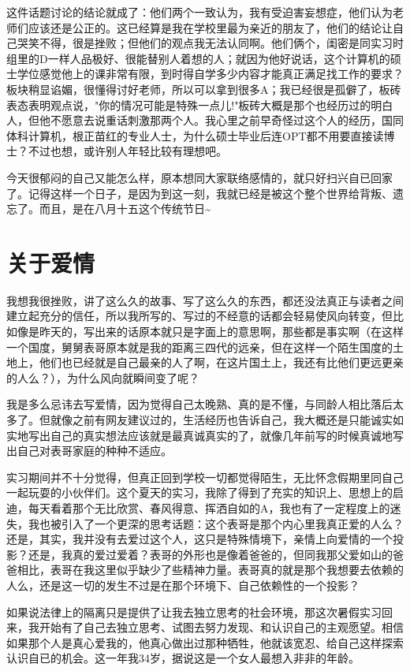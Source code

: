 \documentclass[12pt]{book}
\begin{document}
这件话题讨论的结论就成了：他们两个一致认为，我有受迫害妄想症，他们认为老师们应该还是公正的。这已经算是我在学校里最为亲近的朋友了，他们的结论让自己哭笑不得，很是挫败；但他们的观点我无法认同啊。他们俩个，闺密是同实习时组里的D一样人品极好、很能替别人着想的人；就因为他好说话，这个计算机的硕士学位感觉他上的课非常有限，到时得自学多少内容才能真正满足找工作的要求？板块稍显谄媚，很懂得讨好老师，所以可以拿到很多A；我已经很是孤僻了，板砖表态表明观点说，"你的情况可能是特殊一点儿!"板砖大概是那个也经历过的明白人，但他不愿意去说重话刺激那两个人。我心里之前早奇怪过这个人的经历，国同体科计算机，根正苗红的专业人士，为什么硕士毕业后连OPT都不用要直接读博士？不过也想，或许别人年轻比较有理想吧。

今天很郁闷的自己又能怎么样，原本想同大家联络感情的，就只好扫兴自已回家了。记得这样一个日子，是因为到这一刻，我就已经是被这个整个世界给背叛、遗忘了。而且，是在八月十五这个传统节日\textasciitilde{}~

\chapter{关于爱情}
\label{sec-15}

我想我很挫败，讲了这么久的故事、写了这么久的东西，都还没法真正与读者之间建立起充分的信任，所以我所写的、写过的不经意的话都会轻易使风向转变，但比如像是昨天的，写出来的话原本就只是字面上的意思啊，那些都是事实啊（在这样一个国度，舅舅表哥原本就是我的距离三四代的远亲，但在这样一个陌生国度的土地上，他们也已经就是自己最亲的人了啊，在这片国土上，我还有比他们更远更亲的人么？），为什么风向就瞬间变了呢？

我是多么忌讳去写爱情，因为觉得自己太晚熟、真的是不懂，与同龄人相比落后太多了。但就像之前有网友建议过的，生活经历也告诉自己，我大概还是只能诚实如实地写出自己的真实想法应该就是最真诚真实的了，就像几年前写的时候真诚地写出自己对表哥家庭的种种不适应。

实习期间并不十分觉得，但真正回到学校一切都觉得陌生，无比怀念假期里同自己一起玩耍的小伙伴们。这个夏天的实习，我除了得到了充实的知识上、思想上的启迪，每天看着那个无比欣赏、春风得意、挥洒自如的A，我也有了一定程度上的迷失，我也被引入了一个更深的思考话题：这个表哥是那个内心里我真正爱的人么？还是，其实，我并没有去爱过这个人，这只是特殊情境下，亲情上向爱情的一个投影？还是，我真的爱过爱着？表哥的外形也是像着爸爸的，但同我那父爱如山的爸爸相比，表哥在我这里似乎缺少了些精神力量。表哥真的就是那个我想要去依赖的人么，还是这一切的发生不过是在那个环境下、自己依赖性的一个投影？

如果说法律上的隔离只是提供了让我去独立思考的社会环境，那这次暑假实习回来，我开始有了自己去独立思考、试图去努力发现、和认识自己的主观愿望。相信如果那个人是真心爱我的，他真心做出过那种牺牲，他就该宽忍、给自己这样探索认识自已的机会。这一年我34岁，据说这是一个女人最想入非非的年龄。
\end{document}
